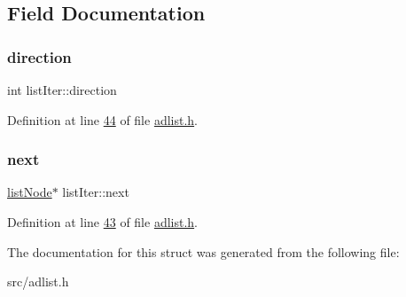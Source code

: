 \subsection{Field Documentation}
\mbox{\label{structlistIter_a3068efdb3a98e9b2b0bebc33e0815322}} 
\subsubsection{\texorpdfstring{direction}{direction}}
{\footnotesize\ttfamily int list\+Iter\+::direction}



Definition at line \hyperlink{adlist_8h_source_l00044}{44} of file \hyperlink{adlist_8h_source}{adlist.\+h}.

\mbox{\label{structlistIter_aa5f95e2ea41a4b6408aff3677c491868}} 
\subsubsection{\texorpdfstring{next}{next}}
{\footnotesize\ttfamily \hyperlink{structlistNode}{list\+Node}$\ast$ list\+Iter\+::next}



Definition at line \hyperlink{adlist_8h_source_l00043}{43} of file \hyperlink{adlist_8h_source}{adlist.\+h}.



The documentation for this struct was generated from the following file\+:\begin{DoxyCompactItemize}
\item 
src/adlist.\+h\end{DoxyCompactItemize}
